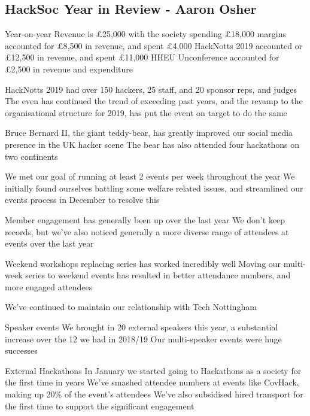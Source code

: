 \documentclass[11pt]{meetingmins}
\begin{document}
\subsection{HackSoc Year in Review - Aaron Osher}
\begin{hiddensubitems}
	\item
	Year-on-year Revenue is \pounds25,000 with the society spending \pounds18,000
		\subitem
		margins accounted for \pounds8,500 in revenue, and spent \pounds4,000
		\subitem
		HackNotts 2019 accounted or \pounds12,500 in revenue, and spent \pounds11,000
		\subitem
		HHEU Unconference accounted for \pounds2,500 in revenue and expenditure
	\item
	HackNotts 2019 had over 150 hackers, 25 staff, and 20 sponsor reps, and judges
		\subitem
		The even has continued the trend of exceeding past years, and the revamp to the organisational structure for 2019, has put the event on target to do the same
	\item
	Bruce Bernard II, the giant teddy-bear, has greatly improved our social media presence in the UK hacker scene
		\subitem The bear has also attended four hackathons on two continents
	\item
	We met our goal of running at least 2 events per week throughout the year
		\subitem
		We initially found ourselves battling some welfare related issues, and streamlined our events process in December to resolve this
	\item
	Member engagement has generally been up over the last year
		\subitem
		We don't keep records, but we've also noticed generally a more diverse range of attendees at events over the last year
	\item
	Weekend workshops replacing series has worked incredibly well
		\subitem
		Moving our multi-week series to weekend events has resulted in better attendance numbers, and more engaged attendees
	\item
	We've continued to maintain our relationship with Tech Nottingham
	\item
	Speaker events
		\subitem
		We brought in 20 external speakers this year, a substantial increase over the 12 we had in 2018/19
		\subitem
		Our multi-speaker events were huge successes
	\item
	External Hackathons
		\subitem
		In January we started going to Hackathons as a society for the first time in years
		\subitem
		We've smashed attendee numbers at events like CovHack, making up 20\% of the event's attendees
		\subitem
		We've also subsidised hired transport for the first time to support the significant engagement
\end{hiddensubitems}
\end{document}
